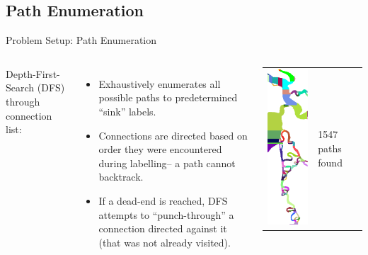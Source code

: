 \documentclass[xcolor=pdflatex,dvipsnames,table]{beamer}
\begin{document}
\subsection{Path Enumeration}
\begin{frame}{Problem Setup: Path Enumeration}
\begin{columns}
 \small
Depth-First-Search (DFS) through connection list:
\begin{itemize}
 \item Exhaustively enumerates all possible paths to predetermined ``sink'' labels.
 \item Connections are directed based on order they were encountered during labelling-- a path cannot backtrack.
 \item If a dead-end is reached, DFS attempts to ``punch-through'' a connection directed against it (that was not already visited).
\end{itemize}

\begin{tabular}{c|l}
 \includegraphics[height=0.7\textheight]{figures/labelled.png} &
 \small {1547 paths found}
\end{tabular}

\end{columns}

\end{frame}
\end{document}
